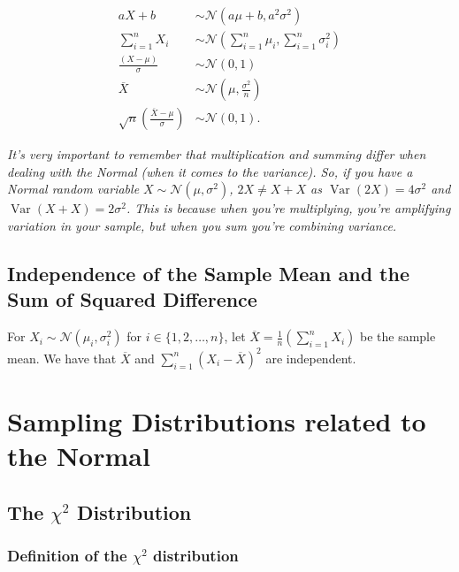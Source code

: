 \documentclass[a4paper, 12pt, twoside]{article}
\DeclareMathOperator{\Var}{Var}
\begin{document}
\begin{align*}
    aX + b                                                 & \sim \mathcal{N}(a\mu + b, a^2\sigma^2) \tag{Linear Transformation} \\
    \sum_{i = 1}^n X_i                                     & \sim
    \mathcal{N}(\sum_{i = 1}^n\mu_i, \sum_{i = 1}^n\sigma_i^2) \tag{Summed}                                                      \\
    \frac{(X - \mu)}{\sigma}                               & \sim \mathcal{N}(0, 1) \tag{Standardised}                           \\    
    \overline{X}                                           & \sim \mathcal{N}(\mu, \frac{\sigma^2}{n}) \tag{Sample Mean}         \\
    \sqrt{n}\left(\frac{\overline{X} - \mu}{\sigma}\right) & \sim \mathcal{N}(0, 1). \tag{Standardised Sample Mean}
\end{align*}

\textit{It's very important to remember that multiplication and summing differ
when dealing with the Normal (when it comes to the variance). So, if you have
a Normal random variable $X \sim \mathcal{N}(\mu, \sigma^2)$, $2X \neq X + X$
as $\Var(2X) = 4\sigma^2$ and $\Var(X + X) = 2\sigma^2$. This is because when
you're multiplying, you're amplifying variation in your sample, but when you 
sum you're combining variance.}

\subsection{Independence of the Sample Mean and the Sum of Squared Difference}

For $X_i \sim \mathcal{N}(\mu_i, \sigma_i^2)$ for $i \in \{1, 2, \ldots, n\}$, 
let $\overline{X} = \frac{1}{n}(\sum_{i = 1}^n X_i)$ be the sample mean. 
We have that $\overline{X}$ and $\sum_{i = 1}^n(X_i - \overline{X})^2$ 
are independent.

\section{Sampling Distributions related to the Normal}

\subsection{The $\chi^2$ Distribution}

\subsubsection{Definition of the $\chi^2$ distribution}
\end{document}
